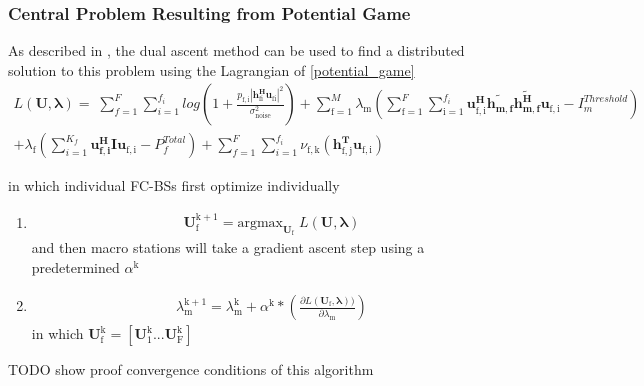 \documentclass[12pt]{article}
\begin{document}
\subsubsection{Central Problem Resulting from Potential Game}
As described in \cite[p.8,9]{boyd2011distributed}, the dual ascent method can be used to find a distributed solution to this problem using the Lagrangian of \eqref{potential_game}
\\
\begin{multline}
L(\mathbf{U,\lambda}) = 
\;
\sum_{f=1}^F
\sum_{i=1}^{f_i}
log(1+\frac{p_{ \mathrm{f,i}}|\mathbf{h^H_{\mathrm{fi}}u_{ \mathrm{fi}}}|^2}{\sigma^2_{ \mathrm{noise}} })
+
\sum_{\mathrm{f=1}}^M \lambda_{\mathrm{m}}
(\sum_{\mathrm{f=1}}^F
\sum_{\mathrm{i=1}}^{f_i}
\mathbf{u_{ \mathrm{f,i}}^H} \mathbf{\tilde{h_{m,f}}} \mathbf{\tilde{h_{m,f}^H}} \mathbf{u_{\mathrm{f,i}}} - I^{Threshold}_{m} )
\\
+ 
\lambda_{\mathrm{f}}(
\sum_{i=1}^{K_f}\mathbf{u_{f,i}^H} \mathbf{I} \mathbf{u_{\mathrm{f,i}}} -  P^{Total}_{f})
+
\sum_{f=1}^F
\sum_{i=1}^{f_i}
\nu_{\mathrm{f,k}}(\mathbf{h^T_{\mathrm{f,j}}}\mathbf{u_{\mathrm{f,i}}})
\end{multline}

in which individual FC-BSs first optimize individually
\begin{enumerate}
\item 
\begin{gather}
\mathbf{U^{\mathrm{k+1}}_{\mathrm{f}}} =\mathrm{argmax}_{\mathbf{U_{\mathrm{f}}}} \; L(\mathbf{U,\lambda})
\end{gather}
and then macro stations will take a gradient ascent step using a 
predetermined $\alpha^{\mathrm{k}}$
\item 
\begin{gather}
\lambda_{\mathrm{m}}^{\mathrm{k+1}} = 
\lambda_{\mathrm{m}}^{\mathrm{k}}
+
\alpha^{\mathrm{k}}*
(\frac{\partial L(\mathbf{\mathbf{U_{\mathrm{f}}},\lambda}) )}{\partial\lambda_{\mathrm{m}}})
\end{gather}
in which $\mathbf{U^{\mathrm{k}}_{\mathrm{f}}} = [\mathbf{U^{\mathrm{k}}_{\mathrm{1}}}...\mathbf{U^{\mathrm{k}}_{\mathrm{F}}}]$

\end{enumerate} 

TODO show proof convergence conditions of this algorithm
\end{document}

